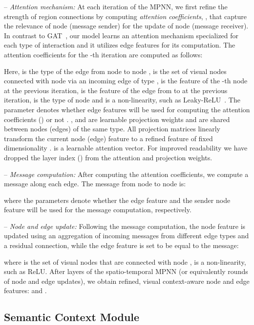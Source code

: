 \documentclass[runningheads]{llncs}
\newcommand{\mysubparagraph}[1]{\smallskip\noindent-- \emph{#1:}}
\begin{document}
\mysubparagraph{Attention mechanism} At each iteration  of the 
MPNN, we first refine the strength of region connections by computing \emph{attention 
coefficients}, , that capture the relevance of node  (message sender) for the update 
of node  (message receiver). In contrast to GAT~\cite{Velickovic:ICLR18}, our model learns an attention mechanism specialized for each type of interaction and it utilizes edge features for its computation.
The attention coefficients for the -th iteration are computed as follows:


Here,  is the type of the 
edge from node  to node ,  is the set of visual nodes connected with node  via an incoming edge of type ,
 is the feature of the -th node at the previous iteration,
 is the feature of the edge from  to  at the previous iteration,  is the type of node  and  is a non-linearity, such as Leaky-ReLU~\cite{He:ICCV15}. The parameter  denotes whether edge features will be used for computing the attention coefficients () or not .
,  and   are 
learnable projection weights and are shared between nodes (edges) of the same type. All projection matrices linearly transform the current node 
(edge) feature to a refined feature of fixed dimensionality .  is a learnable attention vector.
For improved 
readability we have dropped the layer index () from the attention and 
projection weights.

\mysubparagraph{Message computation} After computing the attention coefficients, we compute a message along each edge. The message from node  to node  is:

where the parameters  denote whether the edge feature and the sender node feature will be used for the message computation, respectively. 


\mysubparagraph{Node and edge update} Following the message computation, the 
node feature is updated using an aggregation of incoming messages from different edge types and a residual 
connection, while the 
edge feature is set to be equal to the message:

where  is the set of visual nodes that are connected with node ,  is a non-linearity, such as ReLU. After  layers of the spatio-temporal MPNN (or equivalently  rounds of node and edge 
updates), we obtain refined, visual context-aware node and edge 
features:  and .

\subsection{Semantic Context Module}
\label{subsec:semantic_context}
\end{document}
